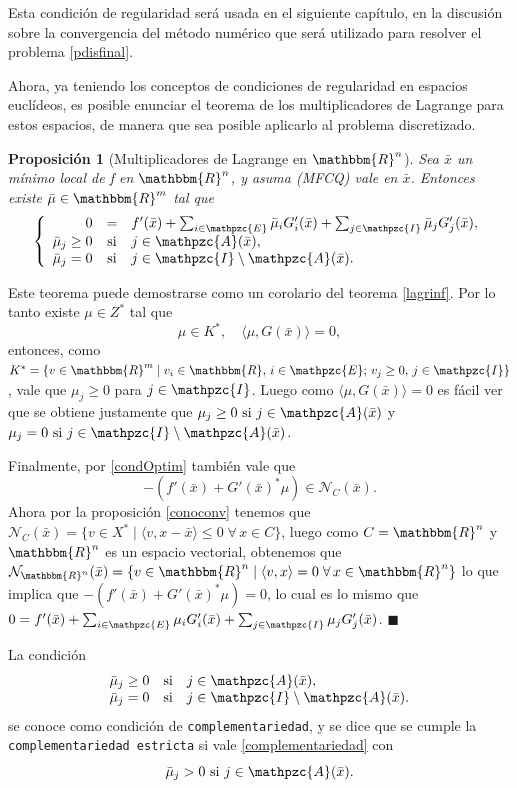 \documentclass[a4paper,10pt]{book}
\newcommand{\R}{\mathbbm{R}}
\newcommand{\Rn}{\R^n}
\newcommand{\bx}{\bar{x}}
\newcommand{\bmu}{\bar{\mu}}
\newcommand{\cN}{\mathcal{N}}
\newcommand{\cI}{\mathpzc{I}}
\newcommand{\cE}{\mathpzc{E}}
\newcommand{\cA}{\mathpzc{A}}
\newtheorem{prop}[teo]{Proposici\'on}
\newenvironment{dem}{\vspace*{-0.1cm}{\it Demostraci\'on:}}{\hfill
$\blacksquare$\\}
\begin{document}
Esta condición de regularidad será usada en el siguiente capítulo, en la discusión sobre la convergencia del método numérico que será utilizado para resolver el problema \eqref{pdisfinal}.

Ahora, ya teniendo los conceptos de condiciones de regularidad en espacios euclídeos, es posible enunciar el teorema de los multiplicadores de Lagrange para estos espacios, de manera que sea posible aplicarlo al problema discretizado.

\begin{prop}[Multiplicadores de Lagrange en $\Rn$]
 Sea $\bx$ un mínimo local de f en $\Rn$, y asuma (MFCQ) vale en $\bx$. Entonces existe $\bmu\in\R^m$ tal que
\begin{equation}\label{KKTfin}
    \left\{\begin{array}{rcl}
 0&=&f'(\bx)+\sum_{i\in\cE}\bmu_i G_i'(\bx) + \sum_{j\in\cI}\bmu_j G_j'(\bx),\\
 \bmu_j\geq0 &\mbox{si}& j\in \cA(\bx),\\
 \bmu_j =0 &\mbox{si}& j\in\cI\setminus\cA(\bx).
 \end{array}\right.
\end{equation}

\end{prop}

\begin{dem}
Este teorema puede demostrarse como un corolario del teorema \eqref{lagrinf}. Por lo tanto existe $\mu\in Z^*$ tal que $$\mu\in K^* ,\quad \langle\mu , G(\bx)\rangle = 0,$$
entonces, como $K^*=\{v\in\R^m\mid v_i\in\R,\, i\in\cE;\,v_j\geq0,\,j\in\cI\}$, vale que $\mu_j\geq0$ para $j\in\cI$. Luego como $\langle\mu , G(\bx)\rangle = 0$ es fácil ver que se obtiene justamente que $\mu_j\geq0 \mbox{ si } j\in \cA(\bx)$ y $\mu_j =0 \mbox{ si } j\in\cI\setminus \cA(\bx)$.

Finalmente, por \eqref{condOptim} también vale que $$ -(f'(\bx) + G'(\bx)^*\mu)\in \cN_C(\bx).$$
Ahora por la proposición \eqref{conoconv} tenemos que $\cN_{C}(\bx)=\{v\in X^*\mid\langle v,x-\bx\rangle\leq 0\; \forall\,x\in C\}$, luego como $C=\Rn$ y $\Rn$ es un espacio vectorial, obtenemos que $\cN_{\Rn}(\bx)=\{v\in {\Rn}\mid\langle v,x\rangle= 0\; \forall\,x\in \Rn\}$ lo que implica que $-(f'(\bx) + G'(\bx)^*\mu)=0$, lo cual es lo mismo que $0=f'(\bx)+\sum_{i\in\cE}\mu_i G_i'(\bx) + \sum_{j\in\cI}\mu_j G_j'(\bx)$.
\end{dem}

La condición 
\begin{equation}\label{complementariedad}
\begin{array}{rcl}
\bmu_j\geq0 &\mbox{si}& j\in \cA(\bx),\\
 \bmu_j =0 &\mbox{si}& j\in\cI\setminus\cA(\bx).
\end{array}
\end{equation}
se conoce como condición de \texttt{complementariedad}, y se dice que se cumple la \texttt{complementariedad estricta} si vale \eqref{complementariedad} con $$\bmu_j>0 \mbox{ si } j\in \cA(\bx).$$
\end{document}
